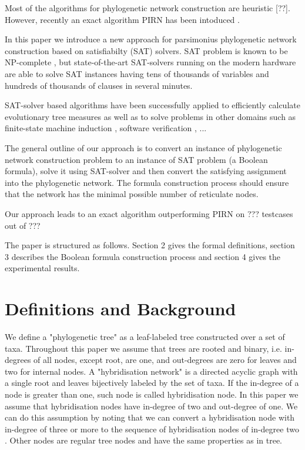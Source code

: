 \documentclass[runningheads, envcountsame, a4paper]{llncs}
\begin{document}
Most of the algorithms for phylogenetic network construction are heuristic [??].
However, recently an exact algorithm PIRN has been intoduced \cite{wu2013algorithm}.

In this paper we introduce a new approach for parsimonius
phylogenetic network construction based on satisfiabilty (SAT) solvers.
SAT problem is known to be NP-complete \cite{}, but state-of-the-art SAT-solvers running on the modern hardware 
are able to solve SAT instances having tens of thousands of variables and hundreds of thousands of clauses in several minutes.

SAT-solver based algorithms have been successfully applied to efficiently calculate evolutionary tree measures \cite{bonet2009efficiently}
as well as to solve problems in other domains such as
finite-state machine induction \cite{heule2010exact}, software verification \cite{}, ...

The general outline of our approach is to convert an instance of phylogenetic network construction 
problem to an instance of SAT problem (a Boolean formula), solve it using SAT-solver and then convert 
the satisfying assignment into the phylogenetic network. The formula construction process should ensure that
the network has the minimal possible number of reticulate nodes.

Our approach leads to an exact algorithm outperforming PIRN on ??? testcases out of ???

The paper is structured as follows. Section 2 gives the formal definitions, section 3 describes the Boolean formula
construction process and section 4 gives the experimental results.

\section{Definitions and Background}

We define a "phylogenetic tree" as a leaf-labeled tree constructed over a set of taxa. Throughout this paper we assume that trees are rooted and binary, i.e. in-degrees of all nodes, except root, are one, and out-degrees are zero for leaves and two for internal nodes. A "hybridisation network" is a directed acyclic graph with a single root and leaves bijectively labeled by the set of taxa. If the in-degree of a node is greater than one, such node is called hybridisation node. In this paper we assume that hybridisation nodes have in-degree of two and out-degree of one. We can do this assumption by noting that we can convert a hybridisation node with in-degree of three or more to the sequence of hybridisation nodes of in-degree two \cite{wu2010close}. Other nodes are regular tree nodes and have the same properties as in tree.
\end{document}
